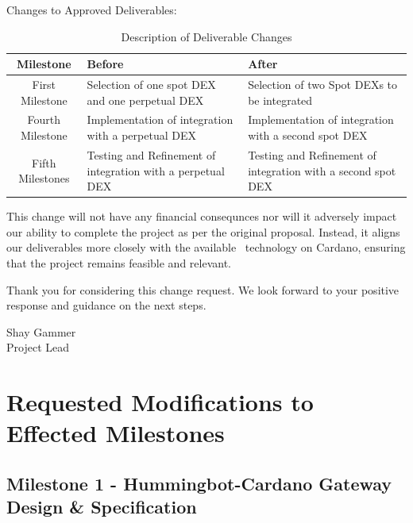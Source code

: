 \documentclass{article}
\begin{document}
Changes to Approved Deliverables:
\begin{table}[h]
    \centering
    \begin{tabular}{|c|p{6cm}|p{6cm}|}
    \hline
    \textbf{Milestone} & \textbf{Before} & \textbf{After} \\
    \hline
    First Milestone & Selection of one spot DEX and one perpetual DEX & Selection of two Spot DEXs to be integrated \\
    \hline
    Fourth Milestone & Implementation of integration with a perpetual DEX & Implementation of integration with a second spot DEX \\
    \hline
    Fifth Milestones & Testing and Refinement of integration with a perpetual DEX & Testing and Refinement of integration with a second spot DEX \\
    \hline
    \end{tabular}
    \caption{Description of Deliverable Changes}
    \label{tab:deliverable_changes}
\end{table}
    
This change will not have any financial consequnces nor will it adversely impact our ability to complete the project as per the original proposal. Instead, it aligns our deliverables more closely with the available \
technology on Cardano, ensuring that the project remains feasible and relevant.

Thank you for considering this change request. We look forward to your positive response and guidance on the next steps.

\bigskip %

Shay Gammer \\
Project Lead\\

\pagebreak
\section*{Requested Modifications to Effected Milestones}
\subsection*{Milestone 1 - Hummingbot-Cardano Gateway Design \& Specification}
\end{document}
